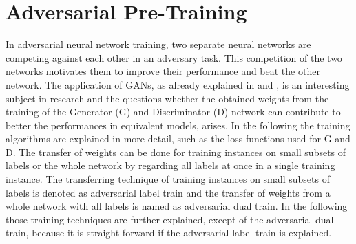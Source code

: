 
\section{Adversarial Pre-Training}\label{sec:nn_adv}
\thesisStateRevised
In adversarial neural network training, two separate neural networks are competing against each other in an adversary task.
This competition of the two networks motivates them to improve their performance and beat the other network.
The application of GANs, as already explained in  and , is an interesting subject in research and the questions whether the obtained weights from the training of the Generator (G) and Discriminator (D) network can contribute to better the performances in equivalent models, arises.
In the following the training algorithms are explained in more detail, such as the loss functions used for G and D.
The transfer of weights can be done for training instances on small subsets of labels or the whole network by regarding all labels at once in a single training instance.
The transferring technique of training instances on small subsets of labels is denoted as adversarial label train and the transfer of weights from a whole network with all labels is named as adversarial dual train.
In the following those training techniques are further explained, except of the adversarial dual train, because it is straight forward if the adversarial label train is explained.



